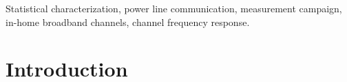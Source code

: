 \documentclass[journal]{IEEEtran}
\begin{document}
\begin{IEEEkeywords}
Statistical characterization, power line communication, measurement campaign, in-home broadband channels, channel frequency response.
\end{IEEEkeywords}

\IEEEpeerreviewmaketitle

\section{Introduction}

%
\end{document}
